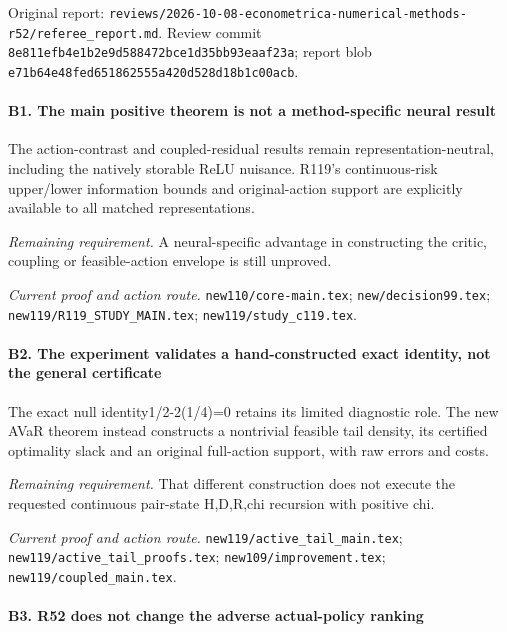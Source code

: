 Original report: \nolinkurl{reviews/2026-10-08-econometrica-numerical-methods-r52/referee_report.md}. Review commit \nolinkurl{8e811efb4e1b2e9d588472bce1d35bb93eaaf23a}; report blob \nolinkurl{e71b64e48fed651862555a420d528d18b1c00acb}.

\paragraph{B1. The main positive theorem is not a method-specific neural result}

The action-contrast and coupled-residual results remain representation-neutral, including the natively storable ReLU nuisance. R119's continuous-risk upper/\allowbreak{}lower information bounds and original-action support are explicitly available to all matched representations.

\par\emph{Remaining requirement.} A neural-specific advantage in constructing the critic, coupling or feasible-action envelope is still unproved.

\par\emph{Current proof and action route.} \nolinkurl{new110/core-main.tex}; \nolinkurl{new/decision99.tex}; \nolinkurl{new119/R119_STUDY_MAIN.tex}; \nolinkurl{new119/study_c119.tex}.

\paragraph{B2. The experiment validates a hand-constructed exact identity, not the general certificate}

The exact null identity1/2-2(1/4)=0 retains its limited diagnostic role. The new AVaR theorem instead constructs a nontrivial feasible tail density, its certified optimality slack and an original full-action support, with raw errors and costs.

\par\emph{Remaining requirement.} That different construction does not execute the requested continuous pair-state H,D,R,chi recursion with positive chi.

\par\emph{Current proof and action route.} \nolinkurl{new119/active_tail_main.tex}; \nolinkurl{new119/active_tail_proofs.tex}; \nolinkurl{new109/improvement.tex}; \nolinkurl{new119/coupled_main.tex}.

\paragraph{B3. R52 does not change the adverse actual-policy ranking}

